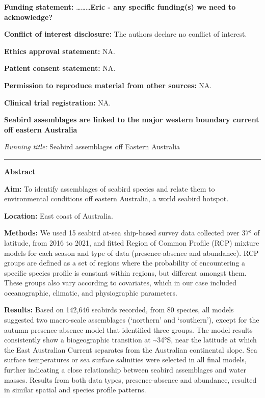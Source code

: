 \documentclass{article}
\begin{document}
\textbf{Funding statement:} \ldots\ldots\ldots{}\textbf{Eric - any specific funding(s) we need to acknowledge?}

\textbf{Conflict of interest disclosure:} The authors declare no conflict of interest.

\textbf{Ethics approval statement:} NA.

\textbf{Patient consent statement:} NA.

\textbf{Permission to reproduce material from other sources:} NA.

\textbf{Clinical trial registration:} NA.

\newpage

\begin{center}
\textbf{Seabird assemblages are linked to the major western boundary current off eastern Australia}
\end{center}

\emph{Running title:} Seabird assemblages off Eastern Australia

\begin{center}\rule{0.5\linewidth}{0.5pt}\end{center}

\textbf{Abstract}

\textbf{Aim:} To identify assemblages of seabird species and relate them to environmental conditions off eastern Australia, a world seabird hotspot.

\textbf{Location:} East coast of Australia.

\textbf{Methods:} We used 15 seabird at-sea ship-based survey data collected over 37° of latitude, from 2016 to 2021, and fitted Region of Common Profile (RCP) mixture models for each season and type of data (presence-absence and abundance). RCP groups are defined as a set of regions where the probability of encountering a specific species profile is constant within regions, but different amongst them. These groups also vary according to covariates, which in our case included oceanographic, climatic, and physiographic parameters.

\textbf{Results:} Based on 142,646 seabirds recorded, from 80 species, all models suggested two macro-scale assemblages (`northern' and `southern'), except for the autumn presence-absence model that identified three groups. The model results consistently show a biogeographic transition at \textasciitilde34°S, near the latitude at which the East Australian Current separates from the Australian continental slope. Sea surface temperatures or sea surface salinities were selected in all final models, further indicating a close relationship between seabird assemblages and water masses. Results from both data types, presence-absence and abundance, resulted in similar spatial and species profile patterns.
\end{document}
